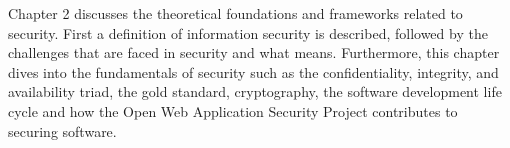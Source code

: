 Chapter 2 discusses the theoretical foundations and frameworks related to security. First a definition of information security is described, followed by the challenges that are faced in security and what  means. Furthermore, this chapter dives into the fundamentals of security such as the confidentiality, integrity, and availability triad, the gold standard, cryptography, the software development life cycle and how the Open Web Application Security Project contributes to securing software.
